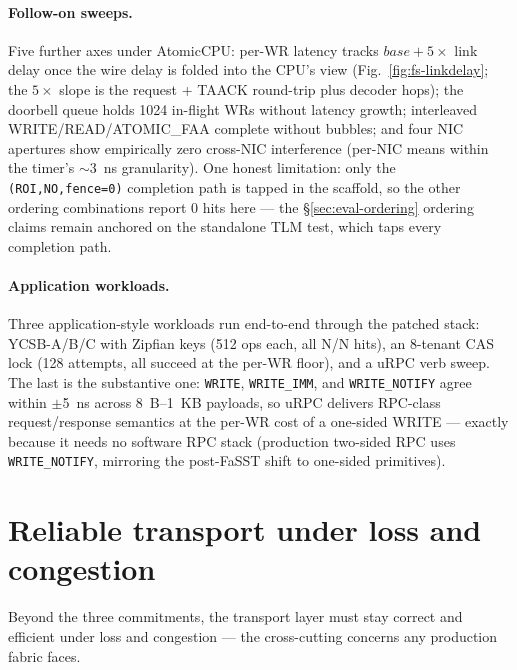 \documentclass[10pt,twocolumn]{article}
\begin{document}
\paragraph{Follow-on sweeps.}
Five further axes under AtomicCPU: per-WR latency tracks
$base + 5\times$ link delay once the wire delay is folded into the
CPU's view (Fig.~\ref{fig:fs-linkdelay}; the $5\times$ slope is the
request + TAACK round-trip plus decoder hops); the doorbell queue
holds 1024 in-flight WRs without latency growth; interleaved
WRITE/READ/ATOMIC\_FAA complete without bubbles; and four NIC
apertures show empirically zero cross-NIC interference (per-NIC
means within the timer's $\sim$3~ns granularity). One honest
limitation: only the \texttt{(ROI,NO,fence=0)} completion path is
tapped in the scaffold, so the other ordering combinations report 0
hits here --- the \S\ref{sec:eval-ordering} ordering claims remain
anchored on the standalone TLM test, which taps every completion
path.

\paragraph{Application workloads.}
Three application-style workloads run end-to-end through the
patched stack: YCSB-A/B/C with Zipfian keys (512 ops each, all N/N
hits), an 8-tenant CAS lock (128 attempts, all succeed at the
per-WR floor), and a uRPC verb sweep. The last is the substantive
one: \texttt{WRITE}, \texttt{WRITE\_IMM}, and \texttt{WRITE\_NOTIFY}
agree within $\pm$5~ns across 8~B--1~KB payloads, so uRPC delivers
RPC-class request/response semantics at the per-WR cost of a
one-sided WRITE --- exactly because it needs no software RPC stack
(production two-sided RPC uses \texttt{WRITE\_NOTIFY}, mirroring the
post-FaSST shift to one-sided primitives).

\section{Reliable transport under loss and congestion}
\label{sec:eval-transport}

Beyond the three commitments, the transport layer must stay correct
and efficient under loss and congestion --- the cross-cutting
concerns any production fabric faces.
\end{document}
